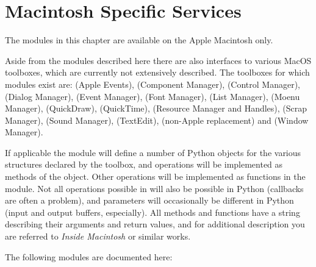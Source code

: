\chapter{Macintosh Specific Services}
\label{macintosh}

The modules in this chapter are available on the Apple Macintosh only.

Aside from the modules described here there are also interfaces to
various MacOS toolboxes, which are currently not extensively
described. The toolboxes for which modules exist are:
 (Apple Events),
 (Component Manager),
 (Control Manager),
 (Dialog Manager),
 (Event Manager),
 (Font Manager),
 (List Manager),
 (Moenu Manager),
 (QuickDraw),
 (QuickTime),
 (Resource Manager and Handles),
 (Scrap Manager),
 (Sound Manager),
 (TextEdit),
 (non-Apple  replacement) and
 (Window Manager).

If applicable the module will define a number of Python objects for
the various structures declared by the toolbox, and operations will be
implemented as methods of the object. Other operations will be
implemented as functions in the module. Not all operations possible in
\C{} will also be possible in Python (callbacks are often a problem), and
parameters will occasionally be different in Python (input and output
buffers, especially). All methods and functions have a 
string describing their arguments and return values, and for
additional description you are referred to \emph{Inside Macintosh} or
similar works.

The following modules are documented here:

